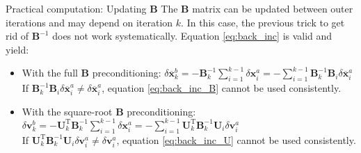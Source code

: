 \documentclass[10pt]{beamer}
\begin{document}
\begin{frame}{Practical computation: Updating $\mathbf{B}$}
The $\mathbf{B}$ matrix can be updated between outer iterations and may depend on iteration $k$. In this case, the previous trick to get rid of $\mathbf{B}^{-1}$ does not work systematically. Equation \eqref{eq:back_inc} is valid and yield:
\vspace{+0.3cm}
\begin{itemize}
\item With the full $\mathbf{B}$ preconditioning: $\delta \overline{\mathbf{x}}^b_k = - \mathbf{B}_k^{-1}\sum_{i=1}^{k-1} \delta \mathbf{x}^a_i \nonumber = - \sum_{i=1}^{k-1} \mathbf{B}_k^{-1} \mathbf{B}_i \delta \overline{\mathbf{x}}^a_i$\\
\vspace{+0.2cm}
If $\mathbf{B}_k^{-1} \mathbf{B}_i \delta \overline{\mathbf{x}}^a_i \ne \delta \overline{\mathbf{x}}^a_i$, equation \eqref{eq:back_inc_B} cannot be used consistently.
\vspace{+0.3cm}
\item With the square-root $\mathbf{B}$ preconditioning: $\delta \mathbf{v}^b_k = - \mathbf{U}_k^\mathrm{T} \mathbf{B}_k^{-1} \sum_{i=1}^{k-1} \delta \mathbf{x}^a_i = - \sum_{i=1}^{k-1} \mathbf{U}_k^\mathrm{T} \mathbf{B}_k^{-1} \mathbf{U}_i \delta \mathbf{v}^a_i$\\
\vspace{+0.2cm}
If $\mathbf{U}_k^\mathrm{T} \mathbf{B}_k^{-1} \mathbf{U}_i \delta \mathbf{v}^a_i \ne \delta \mathbf{v}^a_i$, equation \eqref{eq:back_inc_U} cannot be used consistently.
\end{itemize}
\end{frame}
\end{document}
